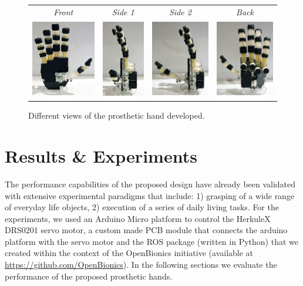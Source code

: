  \begin{figure}[ht]
\centering
\begin{tabular}[50]{ c c c c }
{\it{Front}} & {\it{Side 1}} & {\it{Side 2}} & {\it{Back}}\\
\includegraphics[height=3.4cm]{figures/paper_images/hand1.jpg}&
\includegraphics[height=3.4cm]{figures/paper_images/hand2.jpg}&
\includegraphics[height=3.4cm]{figures/paper_images/hand3.jpg}&
\includegraphics[height=3.4cm]{figures/paper_images/hand4.jpg}\\
\end{tabular}
\caption{Different views of the prosthetic hand developed.} 
\label{RobotHandViews}
\end{figure} 

\section{Results \& Experiments}

The performance capabilities of the proposed design have already been validated with extensive experimental paradigms that include: 1) grasping of a wide range of everyday life objects, 2) execution of a series of daily living tasks. For the experiments, we used an Arduino Micro platform \cite{Arduino} to control the HerkuleX DRS0201 servo motor, a custom made PCB module that connects the arduino platform with the servo motor and the ROS package (written in Python) that we created within the context of the OpenBionics initiative (available at \url{https://github.com/OpenBionics}). In the following sections we evaluate the performance of the proposed prosthetic hands.

